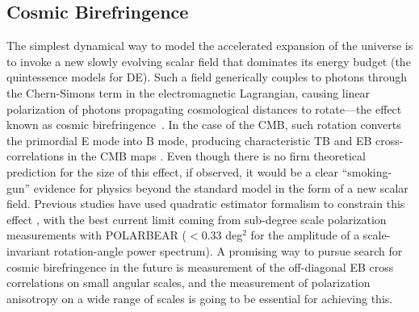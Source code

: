 \subsection{Cosmic Birefringence}
\label{sec-biref}
The simplest dynamical way to model the accelerated expansion of the universe is to invoke a new slowly evolving scalar field that dominates its energy budget (the quintessence models for DE). Such a field generically couples to photons through the Chern-Simons term in the electromagnetic Lagrangian, causing linear polarization of photons propagating cosmological distances to rotate---the effect known as cosmic birefringence~\cite{Carroll:1998zi}. In the case of the CMB, such rotation converts the primordial E mode into B mode, producing characteristic TB and EB cross-correlations in the CMB maps \cite{Kamionkowski:2008fp,Gluscevic:2009mm}. Even though there is no firm theoretical prediction for the size of this effect, if observed, it would be a clear “smoking-gun” evidence for physics beyond the standard model in the form of a new scalar field. Previous studies have used quadratic estimator formalism to constrain this effect \cite{Gluscevic:2012me}, with the best current limit coming from sub-degree scale polarization measurements with POLARBEAR \cite{Ade:2015cao} ($<0.33$ deg$^2$ for the amplitude of a scale-invariant rotation-angle power spectrum). A promising way to pursue search for cosmic birefringence in the future is measurement of the off-diagonal EB cross correlations on small angular scales, and the measurement of polarization anisotropy on a wide range of scales is going to be essential for achieving this. 

